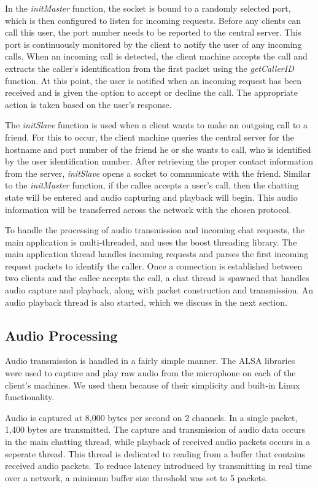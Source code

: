 In the \textit{initMaster} function, the socket is bound to a randomly selected 
port, which is then configured to listen for incoming requests. 
Before any clients can call this user, the port number needs to be reported to
the central server. This port is continuously 
monitored by the client to notify the user of any incoming calls.  When an incoming
call is detected, the client machine accepts the call and extracts the caller's 
identification from the first packet using the 
\textit{getCallerID} function.  At this point, the user is notified when an 
incoming request has been received and is given the option to accept or decline
the call.  The appropriate action is taken based on the user's response.

The \textit{initSlave} function is used when a client wants to make an outgoing
call to a friend.  For this to occur, the client machine queries the central 
server for the hostname and port number of the friend he or she wants to call,
who is identified by the user identification number.  After retrieving the proper contact 
information from the server, \textit{initSlave} opens a socket to 
communicate with the friend.  Similar to the \textit{initMaster} function, if the
callee accepts a user's call, then the chatting state will be entered and audio
capturing and playback will begin. This audio information will be transferred across
the network with the chosen protocol.

To handle the processing of audio transmission and incoming chat requests, the
main application is multi-threaded, and uses the boost threading library. The
main application thread handles incoming requests and parses the first
incoming request packets to identify the caller. Once a connection
is established between two clients and the callee accepts the call, a chat
thread is spawned that handles audio capture and playback, along with packet
construction and transmission. An audio playback thread is also started, which
we discuss in the next section.


\subsection{Audio Processing}
\label{subsec:audio_proc}

Audio transmission is handled in a fairly simple manner. The ALSA libraries
were used to capture and play raw audio from the microphone on each of the 
client's machines. We used them because of their simplicity and
built-in Linux functionality.

Audio is captured at 8,000 bytes per second on 2 channels.  In a 
single packet, 1,400 bytes are transmitted.  The capture and transmission of audio 
data occurs in the main chatting thread, while playback of received
audio packets occurs in a seperate thread. This thread is dedicated to reading
from a buffer that contains received audio packets. To reduce latency 
introduced by transmitting in real time over a network, a minimum buffer size
threshold was set to 5 packets.


